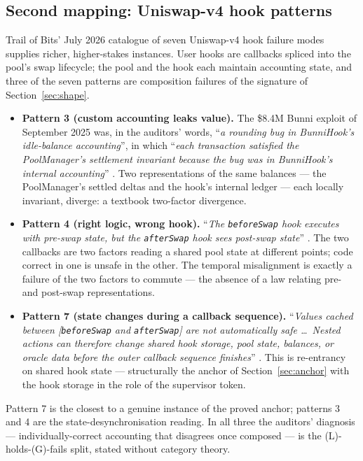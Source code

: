 \documentclass[11pt]{amsart}
\theoremstyle{definition}
\theoremstyle{remark}
\begin{document}
\subsection*{Second mapping: Uniswap-v4 hook patterns}
Trail of Bits' July 2026 catalogue of seven Uniswap-v4 hook failure modes \cite{tob-uniswap}
supplies richer, higher-stakes instances. User hooks are callbacks spliced into the pool's swap
lifecycle; the pool and the hook each maintain accounting state, and three of the seven patterns are
composition failures of the signature of Section~\ref{sec:shape}.
\begin{itemize}[leftmargin=2em]
\item \textbf{Pattern 3 (custom accounting leaks value).} The \$8.4M Bunni exploit of September
  2025 was, in the auditors' words, ``\emph{a rounding bug in BunniHook's idle-balance
  accounting}'', in which ``\emph{each transaction satisfied the PoolManager's settlement invariant
  because the bug was in BunniHook's internal accounting}'' \cite{tob-uniswap}. Two
  representations of the same balances --- the PoolManager's settled deltas and the hook's internal
  ledger --- each locally invariant, diverge: a textbook two-factor divergence.
\item \textbf{Pattern 4 (right logic, wrong hook).} ``\emph{The \texttt{beforeSwap} hook executes
  with pre-swap state, but the \texttt{afterSwap} hook sees post-swap state}'' \cite{tob-uniswap}.
  The two callbacks are two factors reading a shared pool state at different points; code correct in
  one is unsafe in the other. The temporal misalignment is exactly a failure of the two factors to
  commute --- the absence of a law relating pre- and post-swap representations.
\item \textbf{Pattern 7 (state changes during a callback sequence).} ``\emph{Values cached between
  [\texttt{beforeSwap} and \texttt{afterSwap}] are not automatically safe \dots\ Nested actions can
  therefore change shared hook storage, pool state, balances, or oracle data before the outer
  callback sequence finishes}'' \cite{tob-uniswap}. This is re-entrancy on shared hook state ---
  structurally the anchor of Section~\ref{sec:anchor} with the hook storage in the role of the
  supervisor token.
\end{itemize}

Pattern 7 is the closest to a genuine instance of the proved anchor; patterns 3 and 4 are the
state-desynchronisation reading. In all three the auditors' diagnosis --- individually-correct
accounting that disagrees once composed --- is the (L)-holds-(G)-fails split, stated without category
theory.
\end{document}
